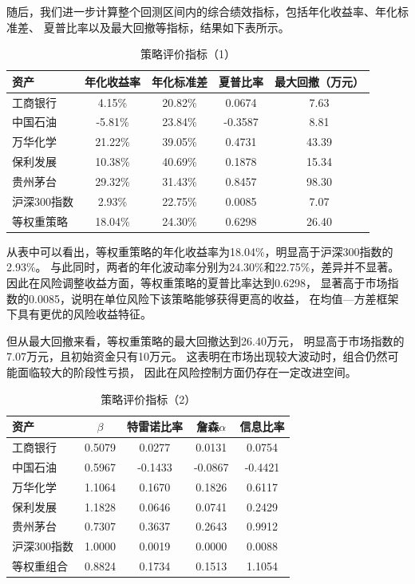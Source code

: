 \documentclass[a4paper,12pt]{article}
\begin{document}
随后，我们进一步计算整个回测区间内的综合绩效指标，包括年化收益率、年化标准差、
夏普比率以及最大回撤等指标，结果如下表所示。

\begin{table}[H]
\centering
\caption{策略评价指标（1）}
\begin{tabular}{lcccc}
\toprule
资产 & 年化收益率 & 年化标准差 & 夏普比率 & 最大回撤（万元） \\
\midrule
工商银行 & 4.15\% & 20.82\% & 0.0674 & 7.63 \\
中国石油 & -5.81\% & 23.84\% & -0.3587 & 8.81 \\
万华化学 & 21.22\% & 39.05\% & 0.4731 & 43.39 \\
保利发展 & 10.38\% & 40.69\% & 0.1878 & 15.34 \\
贵州茅台 & 29.32\% & 31.43\% & 0.8457 & 98.30 \\
沪深300指数 & 2.93\% & 22.75\% & 0.0085 & 7.07 \\
等权重策略 & 18.04\% & 24.30\% & 0.6298 & 26.40 \\
\bottomrule
\end{tabular}
\end{table}

从表中可以看出，等权重策略的年化收益率为18.04\%，明显高于沪深300指数的2.93\%。
与此同时，两者的年化波动率分别为24.30\%和22.75\%，差异并不显著。
因此在风险调整收益方面，等权重策略的夏普比率达到0.6298，
显著高于市场指数的0.0085，说明在单位风险下该策略能够获得更高的收益，
在均值—方差框架下具有更优的风险收益特征。

但从最大回撤来看，等权重策略的最大回撤达到26.40万元，
明显高于市场指数的7.07万元，且初始资金只有10万元。
这表明在市场出现较大波动时，组合仍然可能面临较大的阶段性亏损，
因此在风险控制方面仍存在一定改进空间。

\begin{table}[H]
\centering
\caption{策略评价指标（2）}
\begin{tabular}{lcccc}
\toprule
资产 & $\beta$ & 特雷诺比率 & 詹森$\alpha$ & 信息比率 \\
\midrule
工商银行 & 0.5079 & 0.0277 & 0.0131 & 0.0754 \\
中国石油 & 0.5967 & -0.1433 & -0.0867 & -0.4421 \\
万华化学 & 1.1064 & 0.1670 & 0.1826 & 0.6117 \\
保利发展 & 1.1828 & 0.0646 & 0.0741 & 0.2429 \\
贵州茅台 & 0.7307 & 0.3637 & 0.2643 & 0.9912 \\
沪深300指数 & 1.0000 & 0.0019 & 0.0000 & 0.0088 \\
等权重组合 & 0.8824 & 0.1734 & 0.1513 & 1.1054 \\
\bottomrule
\end{tabular}
\end{table}
\end{document}
